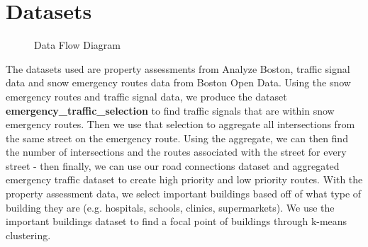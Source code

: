 \documentclass[15pt]{report}
\begin{document}
\section*{Datasets}
\begin{figure}[h!]
	\centering
	\caption{Data Flow Diagram}
	\label{fig:method}
\end{figure}
\noindent The datasets used are property assessments from Analyze Boston, traffic signal data and snow emergency routes data from Boston Open Data. Using the snow emergency routes and traffic signal data, we produce the dataset \textbf{emergency\_traffic\_selection} to find traffic signals that are within snow emergency routes. Then we use that selection to aggregate all intersections from the same street on the emergency route. Using the aggregate, we can then find the number of intersections and the routes associated with the street for every street - then finally, we can use our road connections dataset and aggregated emergency traffic dataset to create high priority and low priority routes. With the property assessment data, we select important buildings based off of what type of building they are (e.g. hospitals, schools, clinics, supermarkets). We use the important buildings dataset to find a focal point of buildings through k-means clustering. 
\end{document}
